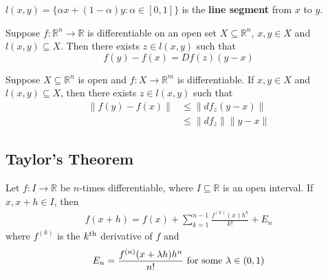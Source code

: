 \documentclass[11pt]{elegantbook}
\begin{document}
\begin{definition}
    \normalfont
    $l(x,y)=\{\alpha x + (1-\alpha)y:\alpha\in[0,1]\}$ is the \textbf{line segment} from $x$ to $y$.
\end{definition}

\begin{theorem}
    Suppose $f : \mathbb{R}^n \rightarrow \mathbb{R}$ is differentiable on an open set $X \subseteq \mathbb{R}^n$, $x, y \in X$ and $l(x, y) \subseteq X$. Then there exists $z \in l(x, y)$ such that $$f(y)-f(x)=Df(z)(y-x)$$
\end{theorem}

\begin{theorem}
    Suppose $X \subseteq \mathbb{R}^n$ is open and $f : X \rightarrow \mathbb{R}^m$ is differentiable. If $x, y \in X$ and $l(x, y) \subseteq X$, then there exists $z \in l(x, y)$ such that
    \begin{equation}
        \begin{aligned}
            \|f(y)-f(x)\|&\leq\|df_z(y-x)\|\\
            &\leq \|df_z\| \|y-x\|
        \end{aligned}
        \nonumber
    \end{equation}
\end{theorem}


\subsection{Taylor's Theorem}
\begin{theorem}
    Let $f : I \rightarrow \mathbb{R}$ be $n$-times differentiable, where $I \subseteq \mathbb{R}$ is an open interval. If $x, x + h \in I$, then
    \begin{equation}
        \begin{aligned}
            f(x+h)=f(x)+\sum_{k=1}^{n-1}\frac{f^{(k)}(x)h^k}{k!}+E_n
        \end{aligned}
        \nonumber
    \end{equation}
    where $f^{(k)}$ is the $k^\textnormal{th}$ derivative of $f$ and
    \begin{equation}
        \begin{aligned}
            E_n=\frac{f^{(n)}(x+\lambda h)h^n}{n!} \textnormal{ for some }\lambda\in(0,1)
        \end{aligned}
        \nonumber
    \end{equation}
\end{theorem}
\end{document}
